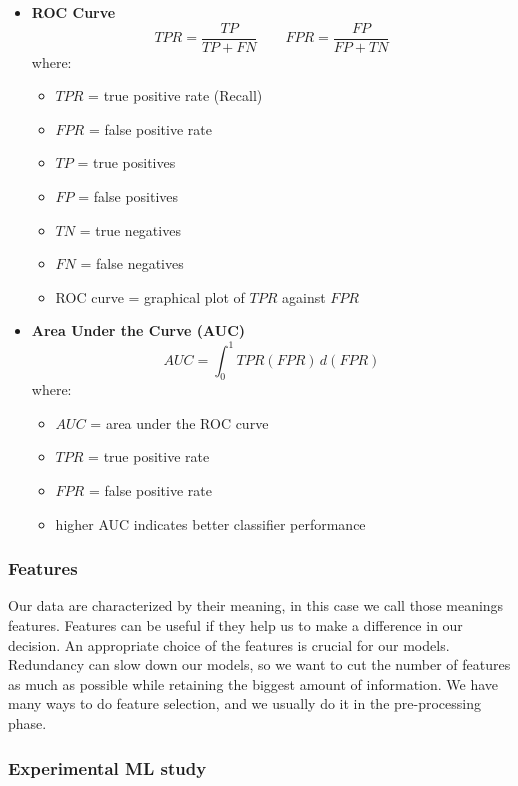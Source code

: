 \begin{itemize}
    \item \textbf{ROC Curve}
    \[
    TPR = \frac{TP}{TP + FN}
    \qquad
    FPR = \frac{FP}{FP + TN}
    \]
    where:
    \begin{itemize}
        \item $TPR$ = true positive rate (Recall)
        \item $FPR$ = false positive rate
        \item $TP$ = true positives
        \item $FP$ = false positives
        \item $TN$ = true negatives
        \item $FN$ = false negatives
        \item ROC curve = graphical plot of $TPR$ against $FPR$
    \end{itemize}

    \item \textbf{Area Under the Curve (AUC)}
    \[
    AUC = \int_{0}^{1} TPR(FPR)\,d(FPR)
    \]
    where:
    \begin{itemize}
        \item $AUC$ = area under the ROC curve
        \item $TPR$ = true positive rate
        \item $FPR$ = false positive rate
        \item higher AUC indicates better classifier performance
    \end{itemize}

\end{itemize}


\subsubsection{Features}

Our data are characterized by their meaning, in this case we call those meanings features. Features can be useful if they help us to make a difference in our decision. An appropriate choice of the features is crucial for our models. Redundancy can slow down our models, so we want to cut the number of features as much as possible while retaining the biggest amount of information. We have many ways to do feature selection, and we usually do it in the pre-processing phase. 

\subsubsection{Experimental ML study}

